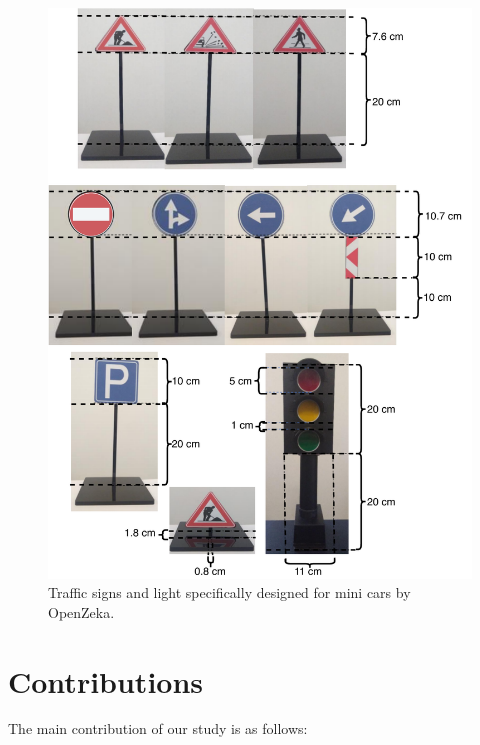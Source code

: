 \begin{figure}[h]
  \centering
  \includegraphics[width=.8\textwidth]{figures/openzeka-traffic-signs.pdf}
  \caption[Traffic signs and lights for mini cars]{Traffic signs and light
  specifically designed for mini cars by OpenZeka.}
  \label{figure:openzeka-traffic-signs}
\end{figure}

\section{Contributions}

The main contribution of our study is as follows:


